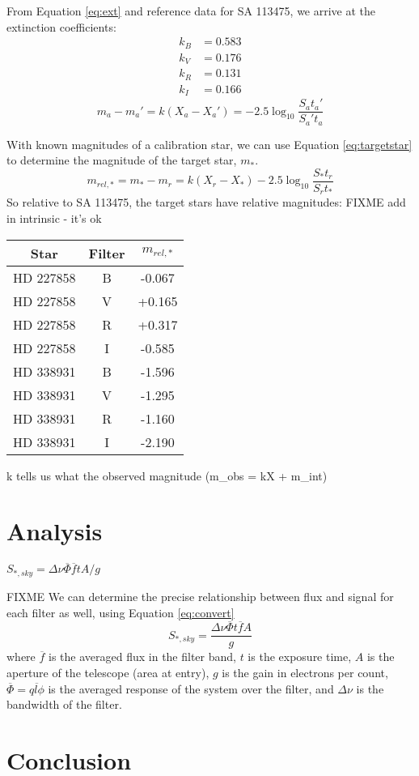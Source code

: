 \documentclass{article}
\newcommand{\obar}[1]{\ensuremath{\overline{ #1 }}}
\begin{document}
From Equation \ref{eq:ext} and reference data for SA 113475, we arrive at the extinction coefficients:
\begin{align*}
k_B&= 0.583\\
k_V&= 0.176\\
k_R&= 0.131\\
k_I&= 0.166
\end{align*}
\begin{equation}
\label{eq:ext}
m_a-m_a'=k(X_a-X_a')=-2.5\log_{10}\frac{S_at_a'}{S_a't_a}
\end{equation}



With known magnitudes of a calibration star, we can use Equation \ref{eq:targetstar} to determine the magnitude of
the target star, $m_*$.
\begin{equation}
\label{eq:targetstar}
m_{rel,*}=m_*-m_r=k(X_r-X_*)-2.5\log_{10}\frac{S_*t_r}{S_rt_*}
\end{equation}
So relative to SA 113475, the target stars have relative magnitudes: FIXME add in intrinsic - it's ok
\begin{center}
\begin{tabular}{c | c | c }
Star & Filter & $m_{rel,*}$\\
\hline
HD 227858 & B & -0.067 \\
HD 227858 & V & +0.165 \\
HD 227858 & R & +0.317  \\
HD 227858 & I &   -0.585 \\

HD 338931 & B & -1.596 \\
HD 338931 & V & -1.295 \\
HD 338931 & R &  -1.160\\
HD 338931 & I & -2.190 \\
\end{tabular}
\end{center}

k tells us what the observed magnitude (m_obs = kX + m_int)

\section{Analysis}
$S_{*,sky}=\Delta\nu{\obar{\Phi}}{\obar{f}}tA/g$



FIXME
We can determine the precise relationship between flux and signal for each filter as well, using Equation \ref{eq:convert}
\begin{equation}
S_{*,sky}=\frac{\Delta\nu \obar{\Phi}t\obar{f}A}{g}
\label{eq:convert}
\end{equation}
where $\obar{f}$ is the averaged flux in the filter band, $t$ is the exposure time, $A$ is the aperture of the telescope (area at entry),
$g$ is the gain in electrons per count, $\obar{\Phi}=\obar{ql\phi}$ is the averaged response of the system over the filter, and $\Delta\nu$ is the
bandwidth of the filter.

\section{Conclusion}






\begin{thebibliography}{9}

\end{thebibliography}
\end{document}
